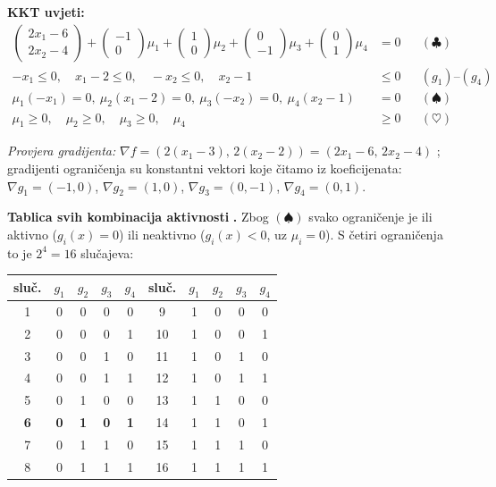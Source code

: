 \begin{zadatak}
\textbf{KKT uvjeti:}
\begin{align}
\begin{pmatrix} 2x_1 - 6 \\ 2x_2 - 4 \end{pmatrix}
+ \begin{pmatrix} -1 \\ 0 \end{pmatrix}\mu_1
+ \begin{pmatrix} 1 \\ 0 \end{pmatrix}\mu_2
+ \begin{pmatrix} 0 \\ -1 \end{pmatrix}\mu_3
+ \begin{pmatrix} 0 \\ 1 \end{pmatrix}\mu_4 &= 0
  && (\clubsuit) \\
-x_1 \le 0,\quad x_1 - 2 \le 0,\quad -x_2 \le 0,\quad x_2 - 1 &\le 0
  && (g_1)\text{--}(g_4) \\
\mu_1(-x_1) = 0,\ \mu_2(x_1-2) = 0,\ \mu_3(-x_2) = 0,\ \mu_4(x_2-1) &= 0
  && (\spadesuit) \\
\mu_1 \ge 0,\quad \mu_2 \ge 0,\quad \mu_3 \ge 0,\quad \mu_4 &\ge 0
  && (\heartsuit)
\end{align}

\emph{Provjera gradijenta:} $\nabla f = (2(x_1-3),\, 2(x_2-2)) =
(2x_1-6,\, 2x_2-4)$ \checkmark; gradijenti ograničenja su konstantni vektori
koje čitamo iz koeficijenata: $\nabla g_1 = (-1,0)$, $\nabla g_2 = (1,0)$,
$\nabla g_3 = (0,-1)$, $\nabla g_4 = (0,1)$. \checkmark

\textbf{Tablica svih kombinacija aktivnosti} \textbf{.} Zbog
$(\spadesuit)$ svako ograničenje je ili aktivno ($g_i(x) = 0$) ili neaktivno
($g_i(x) < 0$, uz $\mu_i = 0$). S četiri ograničenja to je
$2^4 = 16$ slučajeva:

\begin{center}
\small
\begin{tabular}{ccccc@{\qquad}ccccc}
\toprule
\textbf{sluč.} & $g_1$ & $g_2$ & $g_3$ & $g_4$ &
\textbf{sluč.} & $g_1$ & $g_2$ & $g_3$ & $g_4$ \\
\midrule
1 & 0 & 0 & 0 & 0 & 9  & 1 & 0 & 0 & 0 \\
2 & 0 & 0 & 0 & 1 & 10 & 1 & 0 & 0 & 1 \\
3 & 0 & 0 & 1 & 0 & 11 & 1 & 0 & 1 & 0 \\
4 & 0 & 0 & 1 & 1 & 12 & 1 & 0 & 1 & 1 \\
5 & 0 & 1 & 0 & 0 & 13 & 1 & 1 & 0 & 0 \\
\textbf{6} & \textbf{0} & \textbf{1} & \textbf{0} & \textbf{1}
  & 14 & 1 & 1 & 0 & 1 \\
7 & 0 & 1 & 1 & 0 & 15 & 1 & 1 & 1 & 0 \\
8 & 0 & 1 & 1 & 1 & 16 & 1 & 1 & 1 & 1 \\
\bottomrule
\end{tabular}
\end{center}


\end{zadatak}

